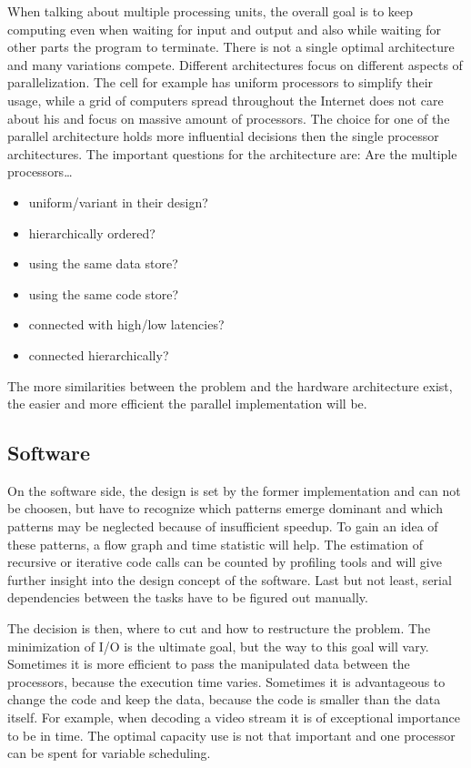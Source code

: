 When talking about multiple processing units, the overall goal is to keep computing even when waiting for input and output and also while waiting for other parts the program to terminate.
There is not a single optimal architecture and many variations compete. Different architectures focus on different aspects of parallelization. The cell for example has uniform processors to simplify their usage, while a grid of computers spread throughout the Internet does not care about his and focus on massive amount of processors. The choice for one of the parallel architecture holds more influential decisions then the single processor architectures. The important questions for the architecture are:
\vskip 12pt
\indent Are the multiple processors\dots
\begin{itemize}
   \item uniform/variant in their design?
   \item hierarchically ordered?
   \item using the same data store?
   \item using the same code store?
   \item connected with high/low latencies?
   \item connected hierarchically?
\end{itemize}
The more similarities between the problem and the hardware architecture exist, the easier and more efficient the parallel implementation will be.\\%


\subsection{Software}
\label{subsec:software}
On the software side, the design is set by the former implementation and can not be choosen, but have to recognize which patterns emerge dominant and which patterns may be neglected because of insufficient speedup. To gain an idea of these patterns, a flow graph and time statistic will help. The estimation of recursive or iterative code calls can be counted by profiling tools and will give further insight into the design concept of the software. Last but not least, serial dependencies between the tasks have to be figured out manually.

The decision is then, where to cut and how to restructure the problem. The minimization of I/O is the ultimate goal, but the way to this goal will vary. Sometimes it is more efficient to pass the manipulated data between the processors, because the execution time varies. Sometimes it is advantageous to change the code and keep the data, because the code is smaller than the data itself. For example, when decoding a video stream it is of exceptional importance to be in time. The optimal capacity use is not that important and one processor can be spent for variable scheduling.

